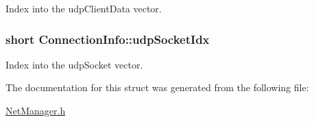 Index into the udp\-Client\-Data vector. 

\hypertarget{structConnectionInfo_ac52c36a648203e28b495cea6d7ad29ba}{
\subsubsection[{udp\-Socket\-Idx}]{\setlength{\rightskip}{0pt plus 5cm}short Connection\-Info\-::udp\-Socket\-Idx}}\label{structConnectionInfo_ac52c36a648203e28b495cea6d7ad29ba}


Index into the udp\-Socket vector. 



The documentation for this struct was generated from the following file\-:\begin{DoxyCompactItemize}
\item 
\hyperlink{NetManager_8h}{Net\-Manager.\-h}\end{DoxyCompactItemize}
